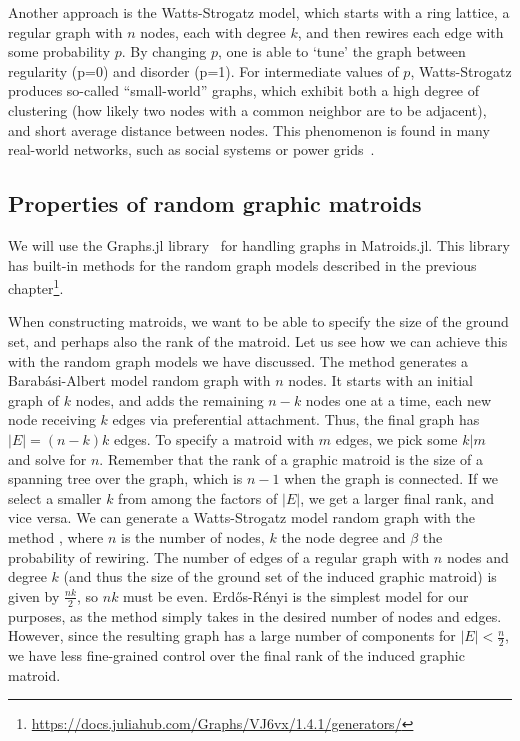 Another approach is the Watts-Strogatz model, which starts with a ring lattice, a regular graph with $n$ nodes, each with degree $k$, and then rewires each edge with some probability $p$. By changing $p$, one is able to `tune' the graph between regularity (p=0) and disorder (p=1). For intermediate values of $p$, Watts-Strogatz produces so-called ``small-world'' graphs, which exhibit both a high degree of clustering (how likely two nodes with a common neighbor are to be adjacent), and short average distance between nodes. This phenomenon is found in many real-world networks, such as social systems or power grids~\cite{Watts-1998}.

\subsection{Properties of random graphic matroids}
We will use the Graphs.jl library~\cite{Graphs2021} for handling graphs in Matroids.jl. This library has built-in methods for the random graph models described in the previous chapter\footnote{\href{https://docs.juliahub.com/Graphs/VJ6vx/1.4.1/generators/}{https://docs.juliahub.com/Graphs/VJ6vx/1.4.1/generators/}}. 

When constructing matroids, we want to be able to specify the size of the ground set, and perhaps also the rank of the matroid. Let us see how we can achieve this with the random graph models we have discussed. The method  generates a Barabási-Albert model random graph with $n$ nodes. It starts with an initial graph of $k$ nodes, and adds the remaining $n-k$ nodes one at a time, each new node receiving $k$ edges via preferential attachment. Thus, the final graph has $|E| = (n-k)k$ edges. To specify a matroid with $m$ edges, we pick some $k|m$ and solve for $n$. Remember that the rank of a graphic matroid is the size of a spanning tree over the graph, which is $n-1$ when the graph is connected. If we select a smaller $k$ from among the factors of $|E|$, we get a larger final rank, and vice versa. We can generate a Watts-Strogatz model random graph with the method , where $n$ is the number of nodes, $k$ the node degree and $\beta$ the probability of rewiring. The number of edges of a regular graph with $n$ nodes and degree $k$ (and thus the size of the ground set of the induced graphic matroid) is given by $\frac{nk}{2}$, so $nk$ must be even. Erdős-Rényi is the simplest model for our purposes, as the method  simply takes in the desired number of nodes and edges. However, since the resulting graph has a large number of components for $|E| < \frac{n}{2}$, we have less fine-grained control over the final rank of the induced graphic matroid.

